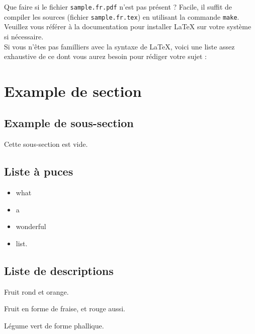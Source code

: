 \documentclass{42-fr}
\begin{document}
    Que faire si le fichier \texttt{sample.fr.pdf} n'est pas pr\'esent ?
    Facile, il suffit de compiler les sources
    (fichier \texttt{sample.fr.tex}) en utilisant la commande
    \texttt{make}. Veuillez vous r\'ef\'erer \`a la documentation
    pour installer LaTeX sur votre syst\`eme si n\'ecessaire.\\

    Si vous n'\^etes pas familliers avec la syntaxe de LaTeX, voici
    une liste assez exhaustive de ce dont vous aurez besoin pour
    r\'ediger votre sujet :\\

    \section{Example de section}


        \subsection{Example de sous-section}

            Cette sous-section est vide.


        \newpage


        \subsection{Liste \`a puces}

            \begin{itemize}\itemsep1pt
                \item what
                \item a
                \item wonderful
                \item list.\\
            \end{itemize}


        \subsection{Liste de descriptions}

            \begin{description}\itemsep3pt
                \item [Orange :] Fruit rond et orange.
                \item [Fraise :] Fruit en forme de fraise, et rouge aussi.
                \item [Concombre :] L\'egume vert de forme phallique.\\
            \end{description}
\end{document}
